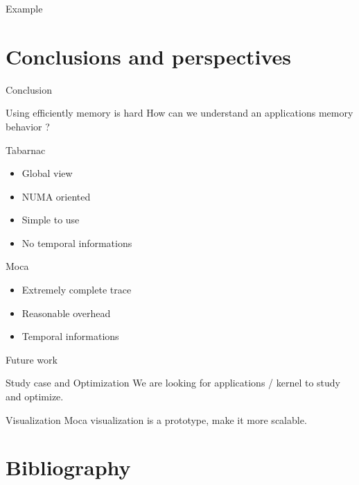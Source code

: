 \documentclass[xcolor={usenames,dvipsnames}]{beamer}
\begin{document}
\begin{frame}{Example}
\end{frame}

\section{Conclusions and perspectives}
\begin{frame}{Conclusion}
    \begin{exampleblock}{Using efficiently memory is hard}
        How can we understand an applications memory behavior ?
    \end{exampleblock}
    \pause
    \begin{block}{Tabarnac}
       \begin{itemize}
           \item Global view
           \item NUMA oriented
           \item Simple to use
           \item No temporal informations
       \end{itemize}
    \end{block}
    \pause
    \begin{alertblock}{Moca}
        \begin{itemize}
            \item Extremely complete trace
            \item Reasonable overhead
            \item Temporal informations
        \end{itemize}
    \end{alertblock}
\end{frame}

\setcounter{finalframe}{\value{framenumber}}

\begin{frame}{Future work}
    \begin{block}{Study case and Optimization}
        We are looking for applications / kernel to study and optimize.
    \end{block}
    \pause
    \begin{alertblock}{Visualization}
       Moca visualization is a prototype, make it more scalable.
    \end{alertblock}
\end{frame}

\section*{Bibliography}
%




\end{document}
